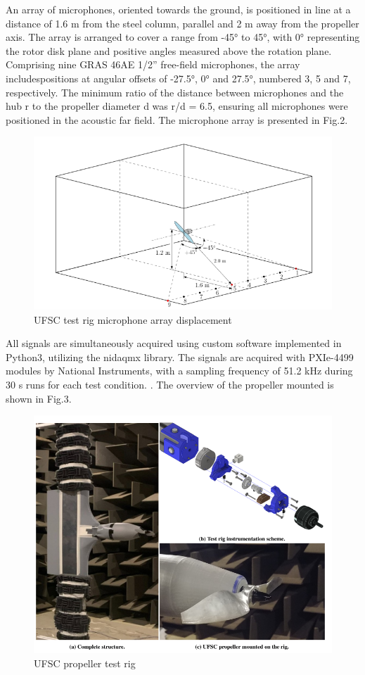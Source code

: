 \documentclass[10pt,fleqn,a4paper,twoside]{article}
\begin{document}
An array of microphones, oriented towards the ground, is positioned in line at a distance of 1.6 m from the steel column, parallel and 2 m away from the propeller axis. The array is arranged to cover a range from -45° to 45°, with 0° representing the rotor disk plane and positive angles measured above the rotation plane. Comprising nine GRAS 46AE 1/2” free-field microphones, the array includespositions at angular offsets of -27.5°, 0° and 27.5°, numbered 3, 5 and 7, respectively. The minimum ratio of the distance between microphones and the hub r to the propeller diameter d was r/d = 6.5, ensuring all microphones were positioned in the acoustic far field. The microphone array is presented in Fig.2.
\begin{figure}[h!]
    \centering
    \includegraphics[angle=0, scale=0.320]{Figures/ufsc_microphone_array.png}
    \caption{UFSC test rig microphone array displacement}
    \label{fig2}
    \end{figure}

All signals are simultaneously acquired using custom software implemented in Python3, utilizing the nidaqmx
library. The signals are acquired with PXIe-4499 modules by National Instruments, with a sampling frequency of 51.2 kHz during 30 s runs for each test condition. \citep{Augusto}. The overview of the propeller mounted is shown in Fig.3.
\begin{figure}[h!]
    \centering
    \includegraphics[angle=0, scale=0.320]{Figures/UFSC_propeller_test_rig.png}
    \caption{UFSC propeller test rig}
    \label{fig3}
    \end{figure}
\end{document}
